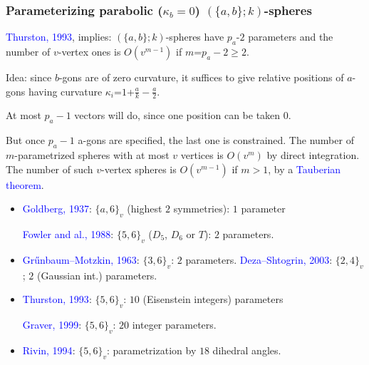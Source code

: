 \documentclass{beamer}
\begin{document}
\begin{frame}\frametitle{Parameterizing parabolic ($\kappa_b=0$) 
$(\{a,b\};k)$-spheres}
\vspace{-3mm}

\textcolor{blue}{Thurston, 1993}, implies: $(\{a,b\};k)$-spheres
 have $p_{a}$-$2$ parameters and the number of $v$-vertex ones is
$O(v^{m-1})$ if $m$=$p_a-2\ge 2$.

Idea: since $b$-gons are of zero curvature, 
it suffices to give relative
positions of $a$-gons having curvature $\kappa_i$=$1$+$\frac{a}{k}-\frac{a}{2}$. 

At most $p_a-1$ vectors will do, since one position can be 
taken 
$0$.

But once $p_a-1$ a-gons are specified, the 
last one is constrained.
The number of $m$-parametrized spheres with at most $v$ vertices is $O(v^m)$ by direct 
integration.
The number of such $v$-vertex spheres is $O(v^{m-1})$ if $m>1$, by 
a \textcolor{blue}{Tauberian theorem}.
\pause

\begin{itemize}
\item \textcolor{blue}{Goldberg, 1937}:  $\{a,6\}_v$ (highest $2$ symmetries): $1$ 
parameter

\textcolor{blue}{Fowler and al., 1988}: $\{5,6\}_v$ ($D_5$, $D_6$ or $T$): $2$ 
parameters. 


\item \textcolor{blue}{Gr\H{u}nbaum--Motzkin, 1963}: $\{3,6\}_v$: $2$ parameters.
 \textcolor{blue}{Deza--Shtogrin, 2003}:
$\{2,4\}_v$; $2$ 
(Gaussian int.) parameters.
\item \textcolor{blue}{Thurston, 1993}:  
$\{5,6\}_v$: $10$ (Eisenstein integers)
 parameters 

\textcolor{blue}{Graver, 1999}: $\{5,6\}_v$: $20$
integer parameters.

\item \textcolor{blue}{Rivin, 1994}: $\{5,6\}_v$: parametrization
by $18$ dihedral angles.
\end{itemize}

\end{frame}
\end{document}
